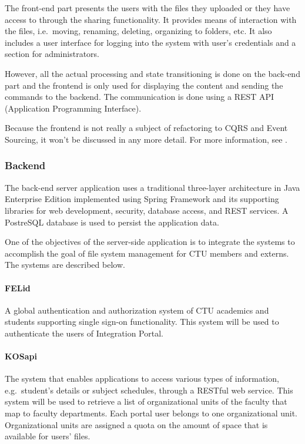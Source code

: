 \documentclass{book}
\begin{document}
The front-end part presents the users with the files they uploaded or
they have access to through the sharing functionality. It provides means
of interaction with the files, i.e.~moving, renaming, deleting,
organizing to folders, etc. It also includes a user interface for
logging into the system with user's credentials and a section for
administrators.

However, all the actual processing and state transitioning is done on
the back-end part and the frontend is only used for displaying the
content and sending the commands to the backend. The communication is
done using a REST API (Application Programming Interface).

Because the frontend is not really a subject of refactoring to CQRS and
Event Sourcing, it won't be discussed in any more detail. For more
information, see \cite{ddd}.

\subsubsection{Backend}\label{backend}

The back-end server application \cite{backend} uses a traditional
three-layer architecture in Java Enterprise Edition implemented using
Spring Framework and its supporting libraries for web development,
security, database access, and REST services. A PostreSQL database is
used to persist the application data.

One of the objectives of the server-side application is to integrate the
systems to accomplish the goal of file system management for CTU members
and externs. The systems are described below.

\paragraph{FELid}\label{felid}

A global authentication and authorization system of CTU academics and
students supporting single sign-on functionality. This system will be
used to authenticate the users of Integration Portal.

\paragraph{KOSapi}\label{kosapi}

The system that enables applications to access various types of
information, e.g.~student's details or subject schedules, through a
RESTful web service. This system will be used to retrieve a list of
organizational units of the faculty that map to faculty departments.
Each portal user belongs to one organizational unit. Organizational
units are assigned a quota on the amount of space that is available for
users' files.
\end{document}
